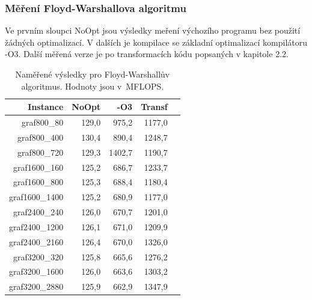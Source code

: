 \documentclass[a4paper,11pt]{article}
\begin{document}
\subsubsection{Měření Floyd-Warshallova algoritmu}
Ve prvním sloupci NoOpt jsou výsledky meření výchozího programu bez použití žádných optimalizací. V dalších je kompilace se základní optimalizací kompilátoru -O3. Další měřená verze je po transformacích kódu popsaných v kapitole 2.2.
\begin{table}[H]
  \begin{center}
      \begin{tabular}{|r|r|r|r|r|}
      \hline
      Instance  	& NoOpt	    & -O3     & Transf	   \\ \hline
      graf800\_80  	& 129,0     & 975,2   & 1177,0     \\ \hline
      graf800\_400     	& 130,4     & 890,4   & 1248,7     \\ \hline
      graf800\_720  	& 129,3     & 1402,7  & 1190,7     \\ \hline
      graf1600\_160    	& 125,2     & 686,7   & 1233,7     \\ \hline
      graf1600\_800  	& 125,3     & 688,4   & 1180,4 	    \\ \hline
      graf1600\_1400   	& 125,2     & 680,9   & 1177,0 	    \\ \hline
      graf2400\_240  	& 126,0     & 670,7   & 1201,0           \\ \hline
      graf2400\_1200   	& 126,1     & 671,0   & 1209,9           \\ \hline
      graf2400\_2160  	& 126,4     & 670,0   & 1326,0           \\ \hline
      graf3200\_320    	& 125,8     & 665,6   & 1276,2           \\ \hline
      graf3200\_1600  	& 126,0     & 663,6   & 1303,2           \\ \hline
      graf3200\_2880   	& 125,9     & 662,9   & 1347,9           \\ \hline
      \end{tabular}
  \caption{Naměřené výsledky pro Floyd-Warshallův algoritmus. Hodnoty jsou v~MFLOPS.}
  \label{tab:fw2}
  \end{center}
\end{table}



\end{document}
